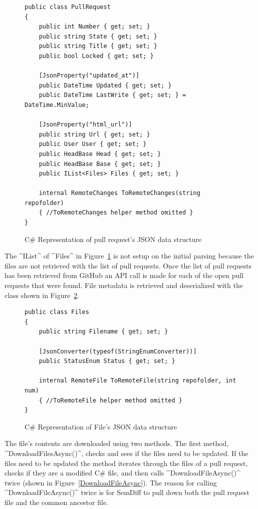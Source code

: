 \documentclass[draftclsnofoot,onecolumn]{IEEEtran}
\begin{document}
\begin{figure}[p]
\centering
\begin{lstlisting}
public class PullRequest
{
    public int Number { get; set; }
    public string State { get; set; }
    public string Title { get; set; }
    public bool Locked { get; set; }
    
	[JsonProperty("updated_at")]
    public DateTime Updated { get; set; }
    public DateTime LastWrite { get; set; } = DateTime.MinValue;
    
	[JsonProperty("html_url")]
    public string Url { get; set; }
    public User User { get; set; }
    public HeadBase Head { get; set; }
    public HeadBase Base { get; set; }
    public IList<Files> Files { get; set; }
	
    internal RemoteChanges ToRemoteChanges(string repofolder)
    { //ToRemoteChanges helper method omitted }
}
\end{lstlisting}
\caption{C\# Representation of pull request's JSON data structure}
\label{PullRequestCode}
\end{figure}

The ^IList^ of ^Files^ in Figure~\ref{PullRequestCode} is not setup on the 
initial parsing because the files are not retrieved with the list of pull 
requests. Once the list of pull requests has been retrieved from GitHub an API 
call is made for each of the open pull requests that were found. File metadata 
is retrieved and deserialized with the class shown in Figure~\ref{GitHubFiles}. 

\begin{figure}[p]
\centering
\begin{lstlisting}
public class Files
{
    public string Filename { get; set; }
	
    [JsonConverter(typeof(StringEnumConverter))]
    public StatusEnum Status { get; set; }
	
    internal RemoteFile ToRemoteFile(string repofolder, int num)	
    { //ToRemoteFile helper method omitted }
}
\end{lstlisting}
\caption{ C\# Representation of File's JSON data structure}
\label{GitHubFiles}
\end{figure}

The file's contents are downloaded using two methods. The first method, 
^DownloadFilesAsync()^, checks and sees if the files need to be 
updated. If the files need to be updated the method iterates through the files of 
a pull request, checks if they are a modified C\# file, and then calls 
^DownloadFileAsync()^ twice (shown in Figure~\ref{DownloadFileAsync}). The 
reason for calling ^DownloadFileAsync()^ twice is for SemDiff to pull down 
both the pull request file and the common ancestor file. 
\end{document}
